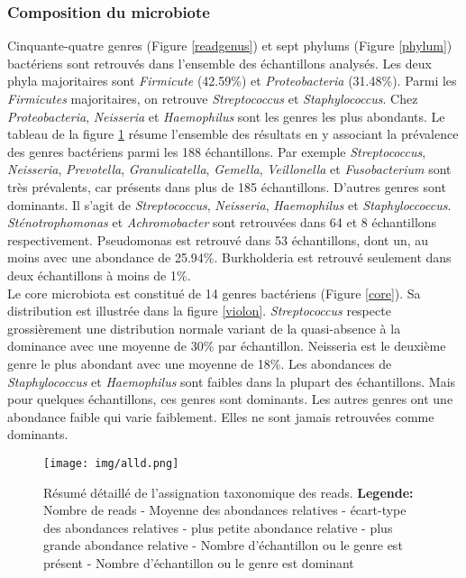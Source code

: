 \documentclass[12pt,a4paper]{article}
\begin{document}
\subsubsection{Composition du microbiote}
Cinquante-quatre genres (Figure \ref{readgenus}) et sept phylums (Figure \ref{phylum}) bactériens sont retrouvés dans l'ensemble des échantillons analysés.
Les deux phyla majoritaires sont \textit{Firmicute} (42.59\%) et \textit{Proteobacteria} (31.48\%). Parmi les \textit{Firmicutes} majoritaires, on retrouve \textit{Streptococcus} et \textit{Staphylococcus}. Chez \textit{Proteobacteria}, \textit{Neisseria} et \textit{Haemophilus} sont les genres les plus abondants.
Le tableau de la figure \ref{alltable} résume l'ensemble des résultats en y associant la prévalence des genres bactériens parmi les 188 échantillons.
Par exemple \textit{Streptococcus}, \textit{Neisseria}, \textit{Prevotella}, \textit{Granulicatella}, \textit{Gemella}, \textit{Veillonella} et \textit{Fusobacterium} sont très prévalents, car présents dans plus de 185 échantillons.
D’autres genres sont dominants. Il s’agit de \textit{Streptococcus}, \textit{Neisseria}, \textit{Haemophilus} et \textit{Staphyloccoccus}. \textit{Sténotrophomonas} et \textit{Achromobacter} sont retrouvées dans 64 et 8 échantillons respectivement. Pseudomonas est retrouvé dans 53 échantillons, dont un, au moins avec une abondance de 25.94\%. Burkholderia est retrouvé seulement dans deux échantillons à moins de 1\%.\\
Le core microbiota est constitué de 14 genres bactériens (Figure \ref{core}). Sa distribution est illustrée dans la figure \ref{violon}.
\textit{Streptococcus} respecte grossièrement une distribution normale variant de la quasi-absence à la dominance avec une moyenne de 30\% par échantillon. Neisseria est le deuxième genre le plus abondant avec une moyenne de 18\%.
Les abondances de \textit{Staphylococcus} et \textit{Haemophilus} sont faibles dans la plupart des échantillons. Mais pour quelques échantillons, ces genres sont dominants. Les autres genres ont une abondance faible qui varie faiblement. Elles ne sont jamais retrouvées comme dominants.


\begin{figure}
\begin{center}
\texttt{[image: img/alld.png]}\hfill
\end{center}
\caption{Résumé détaillé de l'assignation taxonomique des reads. \textbf{Legende:} Nombre de reads - Moyenne des abondances relatives - écart-type des abondances relatives - plus petite abondance relative - plus grande abondance relative - Nombre d'échantillon ou le genre est présent - Nombre d'échantillon ou le genre est dominant}
\label{alltable}
\end{figure}
\end{document}
